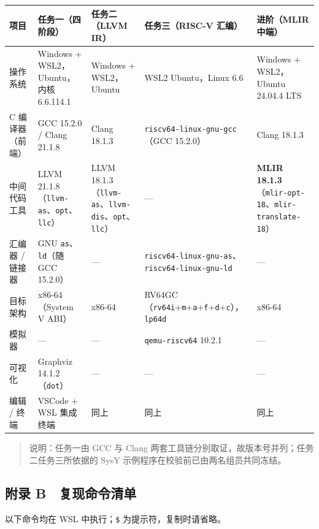 \documentclass[UTF8,a4paper,10pt]{ctexart}
\newcommand{\headcol}{\bfseries}
\begin{document}
\begin{table}[H]
  \centering
  \small
  \setlength{\tabcolsep}{4pt}
  \begin{tabular}{>{\centering\arraybackslash}p{2.5cm}>{\centering\arraybackslash}p{3.2cm}>{\centering\arraybackslash}p{3.2cm}>{\centering\arraybackslash}p{3.2cm}>{\centering\arraybackslash}p{3.2cm}}
    \toprule
    \headcol 项目 & \headcol 任务一（四阶段） & \headcol 任务二（LLVM IR） & \headcol 任务三（RISC-V 汇编） & \headcol 进阶（MLIR 中端） \\
    \midrule
    操作系统 & Windows + WSL2，Ubuntu，内核 6.6.114.1 & Windows + WSL2，Ubuntu & WSL2 Ubuntu，Linux 6.6 & Windows + WSL2，Ubuntu 24.04.4 LTS \\
    C 编译器（前端） & GCC 15.2.0 / Clang 21.1.8 & Clang 18.1.3 & \texttt{riscv64-linux-gnu-gcc}（GCC 15.2.0） & Clang 18.1.3 \\
    中间代码工具 & LLVM 21.1.8（\texttt{llvm-as}、\texttt{opt}、\texttt{llc}） & LLVM 18.1.3（\texttt{llvm-as}、\texttt{llvm-dis}、\texttt{opt}、\texttt{llc}） & — & \textbf{MLIR 18.1.3}（\texttt{mlir-opt-18}、\texttt{mlir-translate-18}） \\
    汇编器 / 链接器 & GNU \texttt{as}、\texttt{ld}（随 GCC 15.2.0） & — & \texttt{riscv64-linux-gnu-as}、\texttt{riscv64-linux-gnu-ld} & — \\
    目标架构 & x86-64（System V ABI） & x86-64 & RV64GC（\texttt{rv64i}+\texttt{m}+\texttt{a}+\texttt{f}+\texttt{d}+\texttt{c}），\texttt{lp64d} & x86-64 \\
    模拟器 & — & — & \texttt{qemu-riscv64} 10.2.1 & — \\
    可视化 & Graphviz 14.1.2（\texttt{dot}） & — & — & — \\
    编辑 / 终端 & VSCode + WSL 集成终端 & 同上 & 同上 & 同上 \\
    \bottomrule
  \end{tabular}
\end{table}


\begin{quote}
说明：任务一由 GCC 与 Clang 两套工具链分别取证，故版本号并列；任务二任务三所依据的 SysY 示例程序在校验前已由两名组员共同冻结。
\end{quote}



\subsection{附录 B　复现命令清单}


以下命令均在 WSL 中执行；\texttt{\$} 为提示符，复制时请省略。
\end{document}
